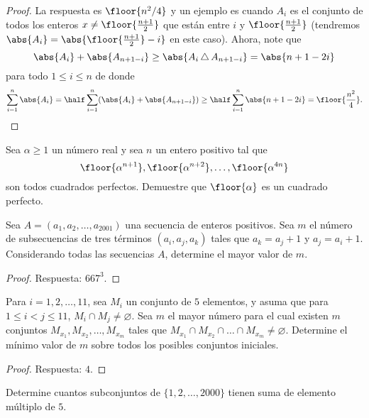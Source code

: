 \begin{proof}
	La respuesta es $\floor{n^2/4}$ y un ejemplo es cuando $A_i$ es el conjunto de todos los enteros $x\ne\floor{\frac{n+1}{2}}$ que están entre $i$ y $\floor{\frac{n+1}{2}}$ (tendremos $\abs{A_i}=\abs{\floor{\frac{n+1}{2}}-i}$ en este caso). Ahora, note que
	\[\abs{A_i}+\abs{A_{n+1-i}}\ge\abs{A_i\,\triangle\,A_{n+1-i}}=\abs{n+1-2i}\]
	para todo $1\le i\le n$ de donde
	\[\sum_{i=1}^n\abs{A_i}=\half\sum_{i=1}^n(\abs{A_i}+\abs{A_{n+1-i}})\ge\half\sum_{i=1}^n\abs{n+1-2i}=\floor{\frac{n^2}{4}}.\]
\end{proof}

\begin{problem}
	Sea $\alpha\ge 1$ un número real y sea $n$ un entero positivo tal que
	\[\floor{\alpha^{n+1}},\floor{\alpha^{n+2}},\dots,\floor{\alpha^{4n}}\]
	son todos cuadrados perfectos. Demuestre que $\floor{\alpha}$ es un cuadrado perfecto.
\end{problem}


\begin{probEG}
	Sea $A=(a_1,a_2,\dots,a_{2001})$ una secuencia de enteros positivos. Sea $m$ el número de subsecuencias de tres términos $(a_i,a_j,a_k)$ tales que $a_k=a_j+1$ y $a_j=a_i+1$. Considerando todas las secuencias $A$, determine el mayor valor de $m$.
\end{probEG}

\begin{proof}
	Respuesta: $667^3$.
\end{proof}

\begin{probEG}
	Para $i=1,2,\dots,11$, sea $M_i$ un conjunto de $5$ elementos, y asuma que para $1\le i<j\le 11$, $M_i\cap M_j\ne\varnothing$. Sea $m$ el mayor número para el cual existen $m$ conjuntos $M_{x_1},M_{x_2},\dots,M_{x_m}$ tales que $M_{x_1}\cap M_{x_2}\cap\dots\cap M_{x_m}\ne\varnothing$. Determine el mínimo valor de $m$ sobre todos los posibles conjuntos iniciales.
\end{probEG}

\begin{proof}
	Respuesta: $4$.
\end{proof}

\begin{probMR}
	Determine cuantos subconjuntos de $\{1,2,\dots,2000\}$ tienen suma de elemento múltiplo de $5$.
\end{probMR}

